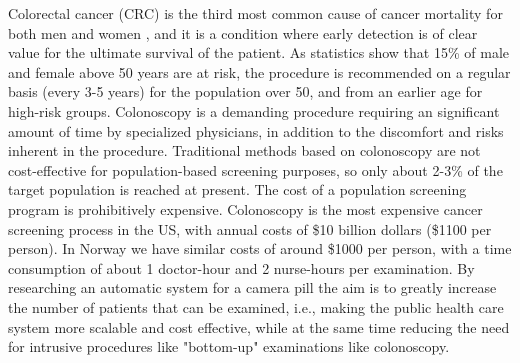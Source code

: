 \documentclass[thesis.tex]{subfiles}
\begin{document}
Colorectal cancer (CRC) is the third most common cause of cancer mortality for both men and women \cite{CancerStatistics10}, and it is a condition where early detection is of clear value for the ultimate survival of the patient. As statistics show that 15\% of male and female above 50 years are at risk, the procedure is recommended on a regular basis (every 3-5 years) for the population over 50, and from an earlier age for high-risk groups. Colonoscopy is a demanding procedure requiring an significant amount of time by specialized physicians, in addition to the discomfort and risks inherent in the procedure. Traditional methods based on colonoscopy are not cost-effective for population-based screening purposes, so only about 2-3\% of the target population is reached at present. The cost of a population screening program is prohibitively expensive. Colonoscopy is the most expensive cancer screening process in the US, with annual costs of \$10 billion dollars (\$1100 per person). In Norway we have similar costs of around \$1000 per person, with a time consumption of about 1 doctor-hour and 2 nurse-hours per examination. By researching an automatic system for a camera pill the aim is to greatly increase the number of patients that can be examined, i.e., making the public health care system more scalable and cost effective, while at the same time reducing the need for intrusive procedures like "bottom-up" examinations like colonoscopy.

\end{document}
